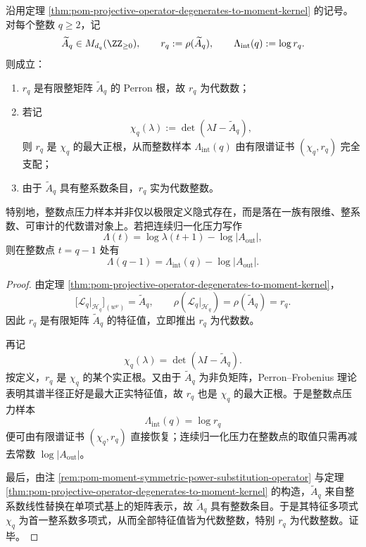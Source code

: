 \begin{theorem}[整数阶压力样本由有限谱证书支配并且皆为代数整数的对数]\label{thm:xi-projective-pressure-integer-spectral-certificate}
沿用定理 \ref{thm:pom-projective-operator-degenerates-to-moment-kernel} 的记号。对每个整数 \(q\ge 2\)，记
\[
\widetilde A_q\in M_{d_q}(\ZZ_{\ge 0}),
\qquad
r_q:=\rho(\widetilde A_q),
\qquad
\Lambda_{\mathrm{int}}(q):=\log r_q.
\]
则成立：
\begin{enumerate}
  \item \(r_q\) 是有限整矩阵 \(\widetilde A_q\) 的 Perron 根，故 \(r_q\) 为代数数；
  \item 若记
  \[
  \chi_q(\lambda):=\det(\lambda I-\widetilde A_q),
  \]
  则 \(r_q\) 是 \(\chi_q\) 的最大正根，从而整数样本 \(\Lambda_{\mathrm{int}}(q)\) 由有限谱证书 \((\chi_q,r_q)\) 完全支配；
  \item 由于 \(\widetilde A_q\) 具有整系数条目，\(r_q\) 实为代数整数。
\end{enumerate}
特别地，整数点压力样本并非仅以极限定义隐式存在，而是落在一族有限维、整系数、可审计的代数谱对象上。若把连续归一化压力写作
\[
\Lambda(t)=\log\lambda(t+1)-\log|A_{\mathrm{out}}|,
\]
则在整数点 \(t=q-1\) 处有
\[
\Lambda(q-1)=\Lambda_{\mathrm{int}}(q)-\log|A_{\mathrm{out}}|.
\]
\end{theorem}
\begin{proof}
由定理 \ref{thm:pom-projective-operator-degenerates-to-moment-kernel}，
\[
\bigl[\mathcal L_q|_{\mathcal H_q}\bigr]_{(w^\nu)}=\widetilde A_q,
\qquad
\rho(\mathcal L_q|_{\mathcal H_q})=\rho(\widetilde A_q)=r_q.
\]
因此 \(r_q\) 是有限矩阵 \(\widetilde A_q\) 的特征值，立即推出 \(r_q\) 为代数数。

再记
\[
\chi_q(\lambda)=\det(\lambda I-\widetilde A_q).
\]
按定义，\(r_q\) 是 \(\chi_q\) 的某个实正根。又由于 \(\widetilde A_q\) 为非负矩阵，Perron--Frobenius 理论表明其谱半径正好是最大正实特征值，故 \(r_q\) 也是 \(\chi_q\) 的最大正根。于是整数点压力样本
\[
\Lambda_{\mathrm{int}}(q)=\log r_q
\]
便可由有限谱证书 \((\chi_q,r_q)\) 直接恢复；连续归一化压力在整数点的取值只需再减去常数 \(\log|A_{\mathrm{out}}|\)。

最后，由注 \ref{rem:pom-moment-symmetric-power-substitution-operator} 与定理 \ref{thm:pom-projective-operator-degenerates-to-moment-kernel} 的构造，\(\widetilde A_q\) 来自整系数线性替换在单项式基上的矩阵表示，故 \(\widetilde A_q\) 具有整数条目。于是其特征多项式 \(\chi_q\) 为首一整系数多项式，从而全部特征值皆为代数整数，特别 \(r_q\) 为代数整数。证毕。
\end{proof}
